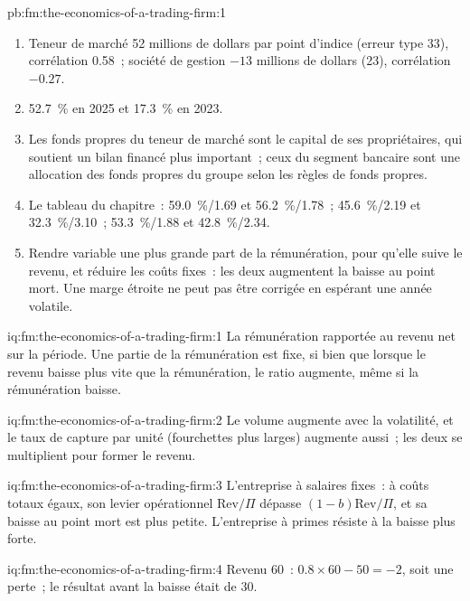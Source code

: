 \begin{solution}{pb:fm:the-economics-of-a-trading-firm:1}
\begin{enumerate}
\item Teneur de marché 52 millions de dollars par point d'indice (erreur type 33), corrélation 0.58~; société de gestion $-13$ millions de dollars (23), corrélation $-0.27$.
\item 52.7~\% en 2025 et 17.3~\% en 2023.
\item Les fonds propres du teneur de marché sont le capital de ses propriétaires, qui soutient un bilan financé plus important~; ceux du segment bancaire sont une allocation des fonds propres du groupe
selon les règles de fonds propres.
\item Le tableau du chapitre~: 59.0~\%/1.69 et 56.2~\%/1.78~; 45.6~\%/2.19 et 32.3~\%/3.10~; 53.3~\%/1.88 et 42.8~\%/2.34.
\item Rendre variable une plus grande part de la rémunération, pour qu'elle suive le revenu, et réduire les coûts fixes~: les deux augmentent la baisse au point mort. Une marge étroite ne peut pas être corrigée
en espérant une année volatile.
\end{enumerate}
\end{solution}

\begin{solution}{iq:fm:the-economics-of-a-trading-firm:1}
La rémunération rapportée au revenu net sur la période. Une partie de la rémunération est fixe, si bien que lorsque le revenu baisse plus vite que la rémunération, le ratio augmente, même si la rémunération baisse.
\end{solution}

\begin{solution}{iq:fm:the-economics-of-a-trading-firm:2}
Le volume augmente avec la volatilité, et le taux de capture par unité (fourchettes plus larges) augmente aussi~; les deux se multiplient pour former le revenu.
\end{solution}

\begin{solution}{iq:fm:the-economics-of-a-trading-firm:3}
L'entreprise à salaires fixes~: à coûts totaux égaux, son levier opérationnel $\mathrm{Rev}/\Pi$ dépasse $(1-b)\mathrm{Rev}/\Pi$, et sa baisse au point mort est
plus petite. L'entreprise à primes résiste à la baisse plus forte.
\end{solution}

\begin{solution}{iq:fm:the-economics-of-a-trading-firm:4}
Revenu 60~: $0.8\times60-50=-2$, soit une perte~; le résultat avant la baisse était de 30.
\end{solution}


